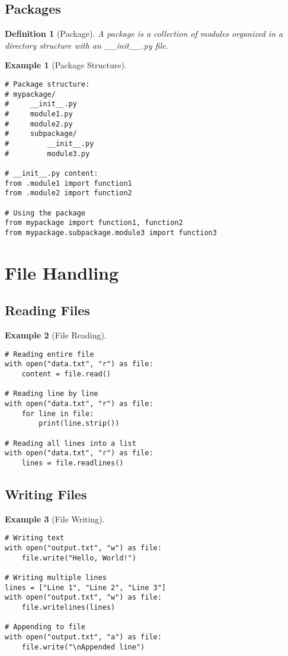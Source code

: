 \documentclass[11pt]{article}
\newtheorem{definition}{Definition}[section]
\newtheorem{example}{Example}[section]
\begin{document}
\subsection{Packages}

\begin{definition}[Package]
A package is a collection of modules organized in a directory structure with an \_\_init\_\_.py file.
\end{definition}

\begin{example}[Package Structure]
\begin{lstlisting}
# Package structure:
# mypackage/
#     __init__.py
#     module1.py
#     module2.py
#     subpackage/
#         __init__.py
#         module3.py

# __init__.py content:
from .module1 import function1
from .module2 import function2

# Using the package
from mypackage import function1, function2
from mypackage.subpackage.module3 import function3
\end{lstlisting}
\end{example}

\section{File Handling}

\subsection{Reading Files}

\begin{example}[File Reading]
\begin{lstlisting}
# Reading entire file
with open("data.txt", "r") as file:
    content = file.read()

# Reading line by line
with open("data.txt", "r") as file:
    for line in file:
        print(line.strip())

# Reading all lines into a list
with open("data.txt", "r") as file:
    lines = file.readlines()
\end{lstlisting}
\end{example}

\subsection{Writing Files}

\begin{example}[File Writing]
\begin{lstlisting}
# Writing text
with open("output.txt", "w") as file:
    file.write("Hello, World!")

# Writing multiple lines
lines = ["Line 1", "Line 2", "Line 3"]
with open("output.txt", "w") as file:
    file.writelines(lines)

# Appending to file
with open("output.txt", "a") as file:
    file.write("\nAppended line")
\end{lstlisting}
\end{example}
\end{document}
